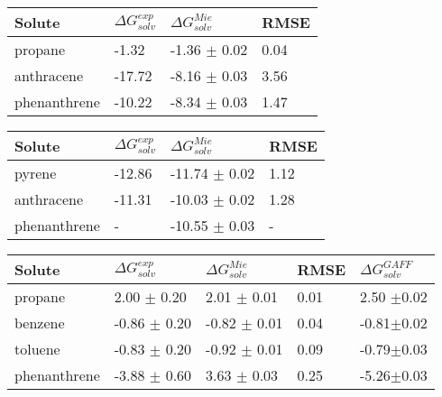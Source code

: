 \begin{table*}[h]
\center
  \label{tbl:solv1tes}
  \begin{tabular}{llll}
    \hline
     Solute & $\Delta G_{solv}^{exp}$ & $\Delta G_{solv}^{Mie}$ & RMSE \\
    \hline
    propane      & -1.32  & -1.36  $\pm$ 0.02 & 0.04 \\
    anthracene   & -17.72 & -8.16  $\pm$ 0.03 & 3.56 \\
    phenanthrene & -10.22 & -8.34  $\pm$ 0.03 & 1.47 \\
    \hline
  \end{tabular}

\end{table*}

\begin{table*}[h]
\center
  \label{tbl:solv1tes}
  \begin{tabular}{llll}
    \hline
     Solute & $\Delta G_{solv}^{exp}$ & $\Delta G_{solv}^{Mie}$ & RMSE \\
    \hline
    pyrene       & -12.86 & -11.74 $\pm$ 0.02 & 1.12\\
    anthracene   & -11.31 & -10.03 $\pm$ 0.02 & 1.28\\
    phenanthrene   & - & -10.55 $\pm$ 0.03 & -\\
    \hline
  \end{tabular}

\end{table*}

\begin{table*}[h]
\center
  \label{tbl:solv2}
  \begin{tabular}{lllll}
    \hline
     Solute      & $\Delta G_{solv}^{exp}$ & $\Delta G_{solv}^{Mie}$ & RMSE &$\Delta G_{solv}^{GAFF}$ \\
    \hline
    propane      &  2.00 $\pm$ 0.20 & 2.01 $\pm$ 0.01& 0.01 &2.50 $\pm$0.02 \\
    benzene      & -0.86 $\pm$ 0.20 & -0.82 $\pm$ 0.01    &  0.04    &-0.81$\pm$0.02 \\  
    toluene      & -0.83 $\pm$ 0.20 & -0.92 $\pm$ 0.01   &  0.09    &-0.79$\pm$0.03\\
    phenanthrene & -3.88 $\pm$ 0.60 & 3.63 $\pm$ 0.03& 0.25 &-5.26$\pm$0.03 \\
    \hline
  \end{tabular}
\end{table*}

